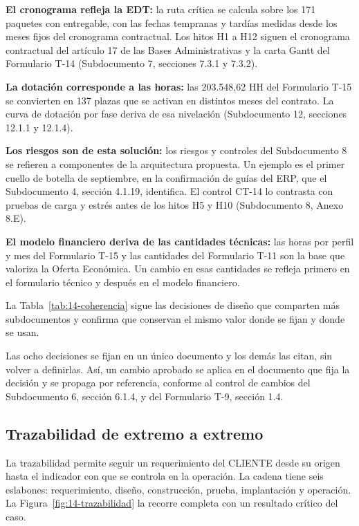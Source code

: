 \textbf{El cronograma refleja la EDT:} la ruta crítica se calcula sobre los 171 paquetes con entregable, con las fechas tempranas y tardías medidas desde los meses fijos del cronograma contractual. Los hitos H1 a H12 siguen el cronograma contractual del artículo 17 de las Bases Administrativas y la carta Gantt del Formulario T-14 (Subdocumento 7, secciones 7.3.1 y 7.3.2).

\textbf{La dotación corresponde a las horas:} las 203.548,62 HH del Formulario T-15 se convierten en 137 plazas que se activan en distintos meses del contrato. La curva de dotación por fase deriva de esa nivelación (Subdocumento 12, secciones 12.1.1 y 12.1.4).

\textbf{Los riesgos son de esta solución:} los riesgos y controles del Subdocumento 8 se refieren a componentes de la arquitectura propuesta. Un ejemplo es el primer cuello de botella de septiembre, en la confirmación de guías del ERP, que el Subdocumento 4, sección 4.1.19, identifica. El control CT-14 lo contrasta con pruebas de carga y estrés antes de los hitos H5 y H10 (Subdocumento 8, Anexo 8.E).

\textbf{El modelo financiero deriva de las cantidades técnicas:} las horas por perfil y mes del Formulario T-15 y las cantidades del Formulario T-11 son la base que valoriza la Oferta Económica. Un cambio en esas cantidades se refleja primero en el formulario técnico y después en el modelo financiero.

La Tabla~\ref{tab:14-coherencia} sigue las decisiones de diseño que comparten más subdocumentos y confirma que conservan el mismo valor donde se fijan y donde se usan.


Las ocho decisiones se fijan en un único documento y los demás las citan, sin volver a definirlas. Así, un cambio aprobado se aplica en el documento que fija la decisión y se propaga por referencia, conforme al control de cambios del Subdocumento 6, sección 6.1.4, y del Formulario T-9, sección 1.4.

\subsection{Trazabilidad de extremo a extremo}

La trazabilidad permite seguir un requerimiento del CLIENTE desde su origen hasta el indicador con que se controla en la operación. La cadena tiene seis eslabones: requerimiento, diseño, construcción, prueba, implantación y operación. La Figura~\ref{fig:14-trazabilidad} la recorre completa con un resultado crítico del caso.

